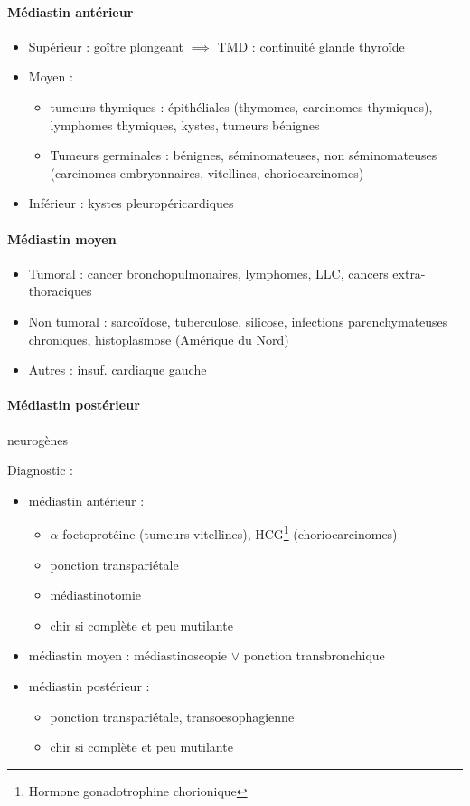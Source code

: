 \documentclass{article}
\begin{document}
\paragraph{Médiastin antérieur}
\begin{itemize}
  \item Supérieur : goître plongeant $\implies$ TMD : continuité glande thyroïde
  \item Moyen : 
    \begin{itemize}
      \item tumeurs thymiques : épithéliales (thymomes, carcinomes thymiques),
        lymphomes thymiques, kystes, tumeurs bénignes
      \item Tumeurs germinales : bénignes, séminomateuses, non séminomateuses
        (carcinomes embryonnaires, vitellines, choriocarcinomes)
    \end{itemize}
  \item Inférieur : kystes pleuropéricardiques
\end{itemize}

\paragraph{Médiastin moyen}
\begin{itemize}
  \item Tumoral : cancer bronchopulmonaires, lymphomes, LLC, cancers
    extra-thoraciques
  \item Non tumoral : sarcoïdose, tuberculose, silicose, infections
    parenchymateuses chroniques, histoplasmose (Amérique du Nord)
  \item Autres : insuf. cardiaque gauche
\end{itemize}

\paragraph{Médiastin postérieur} neurogènes

Diagnostic :
\begin{itemize}
  \item médiastin antérieur : 
    \begin{itemize}
      \item $\alpha$-foetoprotéine (tumeurs vitellines), HCG\footnote{Hormone gonadotrophine chorionique} (choriocarcinomes)
      \item ponction transpariétale
      \item médiastinotomie
      \item chir si complète et peu mutilante
    \end{itemize}
  \item médiastin moyen : médiastinoscopie $\vee$ ponction transbronchique
  \item médiastin postérieur : 
    \begin{itemize}
      \item ponction transpariétale, transoesophagienne
      \item chir si complète et peu mutilante
    \end{itemize}
\end{itemize}
\end{document}
